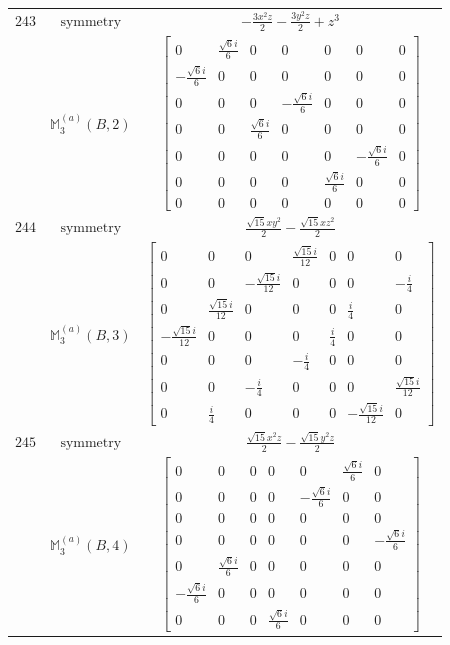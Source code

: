 \documentclass[fleqn,8pt,landscape]{jsarticle}
\begin{document}
\begin{longtable}{ccc}
$ 243 $ & $ \text{symmetry} $ & $ - \frac{3 x^{2} z}{2} - \frac{3 y^{2} z}{2} + z^{3} $ \\
$  $ & $ \mathbb{M}_{3}^{(a)}(B,2) $ & $ \begin{bmatrix} 0 & \frac{\sqrt{6} i}{6} & 0 & 0 & 0 & 0 & 0 \\ - \frac{\sqrt{6} i}{6} & 0 & 0 & 0 & 0 & 0 & 0 \\ 0 & 0 & 0 & - \frac{\sqrt{6} i}{6} & 0 & 0 & 0 \\ 0 & 0 & \frac{\sqrt{6} i}{6} & 0 & 0 & 0 & 0 \\ 0 & 0 & 0 & 0 & 0 & - \frac{\sqrt{6} i}{6} & 0 \\ 0 & 0 & 0 & 0 & \frac{\sqrt{6} i}{6} & 0 & 0 \\ 0 & 0 & 0 & 0 & 0 & 0 & 0 \end{bmatrix} $ \\ \hline
$ 244 $ & $ \text{symmetry} $ & $ \frac{\sqrt{15} x y^{2}}{2} - \frac{\sqrt{15} x z^{2}}{2} $ \\
$  $ & $ \mathbb{M}_{3}^{(a)}(B,3) $ & $ \begin{bmatrix} 0 & 0 & 0 & \frac{\sqrt{15} i}{12} & 0 & 0 & 0 \\ 0 & 0 & - \frac{\sqrt{15} i}{12} & 0 & 0 & 0 & - \frac{i}{4} \\ 0 & \frac{\sqrt{15} i}{12} & 0 & 0 & 0 & \frac{i}{4} & 0 \\ - \frac{\sqrt{15} i}{12} & 0 & 0 & 0 & \frac{i}{4} & 0 & 0 \\ 0 & 0 & 0 & - \frac{i}{4} & 0 & 0 & 0 \\ 0 & 0 & - \frac{i}{4} & 0 & 0 & 0 & \frac{\sqrt{15} i}{12} \\ 0 & \frac{i}{4} & 0 & 0 & 0 & - \frac{\sqrt{15} i}{12} & 0 \end{bmatrix} $ \\ \hline
$ 245 $ & $ \text{symmetry} $ & $ \frac{\sqrt{15} x^{2} z}{2} - \frac{\sqrt{15} y^{2} z}{2} $ \\
$  $ & $ \mathbb{M}_{3}^{(a)}(B,4) $ & $ \begin{bmatrix} 0 & 0 & 0 & 0 & 0 & \frac{\sqrt{6} i}{6} & 0 \\ 0 & 0 & 0 & 0 & - \frac{\sqrt{6} i}{6} & 0 & 0 \\ 0 & 0 & 0 & 0 & 0 & 0 & 0 \\ 0 & 0 & 0 & 0 & 0 & 0 & - \frac{\sqrt{6} i}{6} \\ 0 & \frac{\sqrt{6} i}{6} & 0 & 0 & 0 & 0 & 0 \\ - \frac{\sqrt{6} i}{6} & 0 & 0 & 0 & 0 & 0 & 0 \\ 0 & 0 & 0 & \frac{\sqrt{6} i}{6} & 0 & 0 & 0 \end{bmatrix} $ \\ \hline

\end{longtable}
\end{document}
